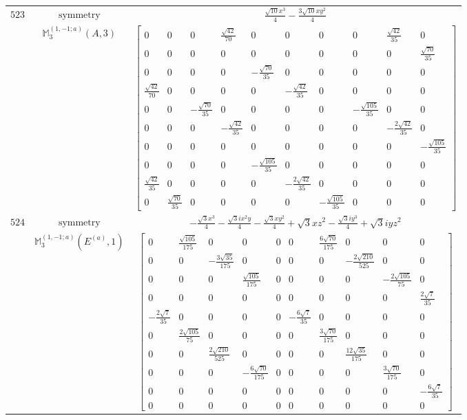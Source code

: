 \documentclass[fleqn,8pt,landscape]{jsarticle}
\begin{document}
\begin{longtable}{ccc}
$ 523 $ & $ \text{symmetry} $ & $ \frac{\sqrt{10} x^{3}}{4} - \frac{3 \sqrt{10} x y^{2}}{4} $ \\
$  $ & $ \mathbb{M}_{3}^{(1,-1;a)}(A,3) $ & $ \begin{bmatrix} 0 & 0 & 0 & \frac{\sqrt{42}}{70} & 0 & 0 & 0 & 0 & \frac{\sqrt{42}}{35} & 0 \\ 0 & 0 & 0 & 0 & 0 & 0 & 0 & 0 & 0 & \frac{\sqrt{70}}{35} \\ 0 & 0 & 0 & 0 & - \frac{\sqrt{70}}{35} & 0 & 0 & 0 & 0 & 0 \\ \frac{\sqrt{42}}{70} & 0 & 0 & 0 & 0 & - \frac{\sqrt{42}}{35} & 0 & 0 & 0 & 0 \\ 0 & 0 & - \frac{\sqrt{70}}{35} & 0 & 0 & 0 & 0 & - \frac{\sqrt{105}}{35} & 0 & 0 \\ 0 & 0 & 0 & - \frac{\sqrt{42}}{35} & 0 & 0 & 0 & 0 & - \frac{2 \sqrt{42}}{35} & 0 \\ 0 & 0 & 0 & 0 & 0 & 0 & 0 & 0 & 0 & - \frac{\sqrt{105}}{35} \\ 0 & 0 & 0 & 0 & - \frac{\sqrt{105}}{35} & 0 & 0 & 0 & 0 & 0 \\ \frac{\sqrt{42}}{35} & 0 & 0 & 0 & 0 & - \frac{2 \sqrt{42}}{35} & 0 & 0 & 0 & 0 \\ 0 & \frac{\sqrt{70}}{35} & 0 & 0 & 0 & 0 & - \frac{\sqrt{105}}{35} & 0 & 0 & 0 \end{bmatrix} $ \\ \hline
$ 524 $ & $ \text{symmetry} $ & $ - \frac{\sqrt{3} x^{3}}{4} - \frac{\sqrt{3} i x^{2} y}{4} - \frac{\sqrt{3} x y^{2}}{4} + \sqrt{3} x z^{2} - \frac{\sqrt{3} i y^{3}}{4} + \sqrt{3} i y z^{2} $ \\
$  $ & $ \mathbb{M}_{3}^{(1,-1;a)}(E^{(a)},1) $ & $ \begin{bmatrix} 0 & \frac{\sqrt{105}}{175} & 0 & 0 & 0 & 0 & \frac{6 \sqrt{70}}{175} & 0 & 0 & 0 \\ 0 & 0 & - \frac{3 \sqrt{35}}{175} & 0 & 0 & 0 & 0 & - \frac{2 \sqrt{210}}{525} & 0 & 0 \\ 0 & 0 & 0 & \frac{\sqrt{105}}{175} & 0 & 0 & 0 & 0 & - \frac{2 \sqrt{105}}{75} & 0 \\ 0 & 0 & 0 & 0 & 0 & 0 & 0 & 0 & 0 & \frac{2 \sqrt{7}}{35} \\ - \frac{2 \sqrt{7}}{35} & 0 & 0 & 0 & 0 & - \frac{6 \sqrt{7}}{35} & 0 & 0 & 0 & 0 \\ 0 & \frac{2 \sqrt{105}}{75} & 0 & 0 & 0 & 0 & \frac{3 \sqrt{70}}{175} & 0 & 0 & 0 \\ 0 & 0 & \frac{2 \sqrt{210}}{525} & 0 & 0 & 0 & 0 & \frac{12 \sqrt{35}}{175} & 0 & 0 \\ 0 & 0 & 0 & - \frac{6 \sqrt{70}}{175} & 0 & 0 & 0 & 0 & \frac{3 \sqrt{70}}{175} & 0 \\ 0 & 0 & 0 & 0 & 0 & 0 & 0 & 0 & 0 & - \frac{6 \sqrt{7}}{35} \\ 0 & 0 & 0 & 0 & 0 & 0 & 0 & 0 & 0 & 0 \end{bmatrix} $ \\ \hline

\end{longtable}
\end{document}
